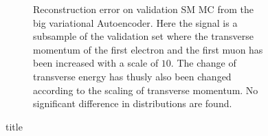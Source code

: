 \begin{figure}[h!]
\begin{subfigure}{.45\textwidth}
        \caption{Reconstruction error on validation SM MC from the big variational Autoencoder. Here the signal is a subsample of the validation 
        set where the transverse momentum of the first electron and the first muon has been increased with a scale of $10$. The change of transverse 
        energy has thusly also been changed according to the scaling of transverse momentum. No significant difference in distributions are found. }
        \label{fig:VAE_big_pt_10}
    \end{subfigure}
    \hfill 
    \caption{title}
    \label{fig:VAE_big_small_pt_10}
\end{figure}

\newpage